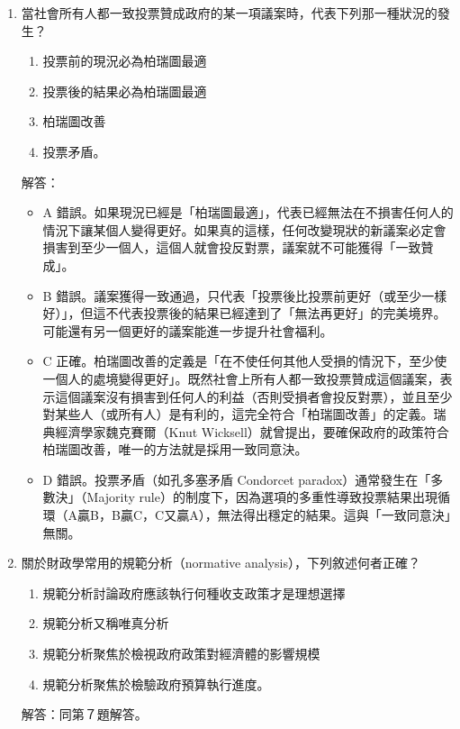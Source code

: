 \documentclass[12pt, a4paper]{article}
\begin{document}
\begin{enumerate}
    \item 當社會所有人都一致投票贊成政府的某一項議案時，代表下列那一種狀況的發生？
        \begin{enumerate}[label=\Alph*.]
            \item 投票前的現況必為柏瑞圖最適
            \item 投票後的結果必為柏瑞圖最適
            \item 柏瑞圖改善
            \item 投票矛盾。
        \end{enumerate}
        解答：
        \begin{itemize}
            \item A 錯誤。如果現況已經是「柏瑞圖最適」，代表已經無法在不損害任何人的情況下讓某個人變得更好。如果真的這樣，任何改變現狀的新議案必定會損害到至少一個人，這個人就會投反對票，議案就不可能獲得「一致贊成」。
            \item B 錯誤。議案獲得一致通過，只代表「投票後比投票前更好（或至少一樣好）」，但這不代表投票後的結果已經達到了「無法再更好」的完美境界。可能還有另一個更好的議案能進一步提升社會福利。
            \item C 正確。柏瑞圖改善的定義是「在不使任何其他人受損的情況下，至少使一個人的處境變得更好」。既然社會上所有人都一致投票贊成這個議案，表示這個議案沒有損害到任何人的利益（否則受損者會投反對票），並且至少對某些人（或所有人）是有利的，這完全符合「柏瑞圖改善」的定義。瑞典經濟學家魏克賽爾（Knut Wicksell）就曾提出，要確保政府的政策符合柏瑞圖改善，唯一的方法就是採用一致同意決。
            \item D 錯誤。投票矛盾（如孔多塞矛盾 Condorcet paradox）通常發生在「多數決」（Majority rule）的制度下，因為選項的多重性導致投票結果出現循環（A贏B，B贏C，C又贏A），無法得出穩定的結果。這與「一致同意決」無關。
        \end{itemize}

    \item 關於財政學常用的規範分析（normative analysis），下列敘述何者正確？
        \begin{enumerate}[label=\Alph*.]
            \item 規範分析討論政府應該執行何種收支政策才是理想選擇
            \item 規範分析又稱唯真分析
            \item 規範分析聚焦於檢視政府政策對經濟體的影響規模
            \item 規範分析聚焦於檢驗政府預算執行進度。
        \end{enumerate}
        解答：同第７題解答。


\end{enumerate}
\end{document}
